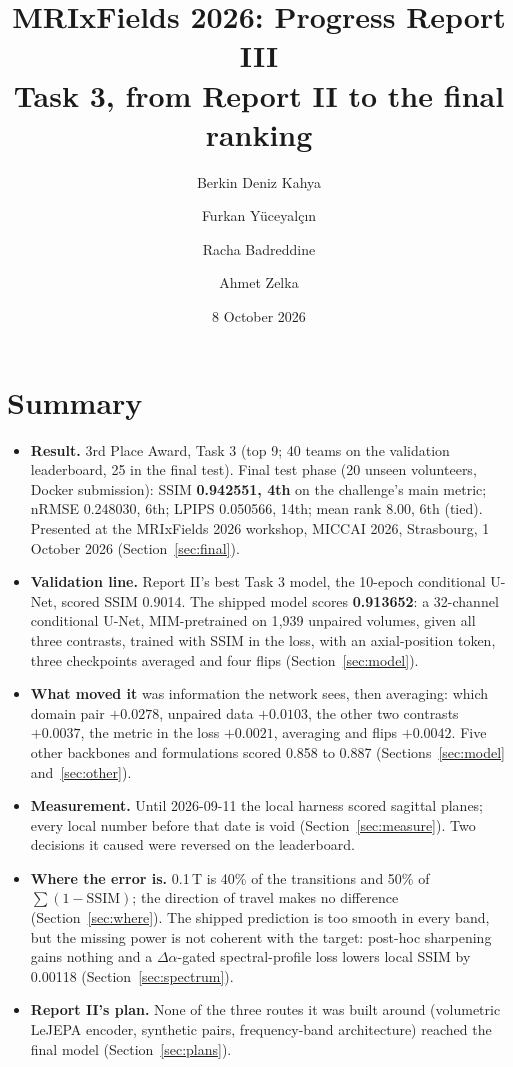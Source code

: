 \documentclass[10pt,a4paper]{article}
\title{\bfseries MRIxFields 2026: Progress Report III\\[0.3em]
\large Task 3, from Report II to the final ranking}
\author{Berkin Deniz Kahya \and Furkan Y\"uceyal\c{c}\i n \and Racha Badreddine \and Ahmet Zelka}
\date{8 October 2026}
\newcommand{\da}{\Delta\alpha}
\begin{document}
\sloppy
\maketitle

\section{Summary}\label{sec:summary}

\begin{itemize}
  \item \textbf{Result.} 3rd Place Award, Task 3 (top 9; 40 teams on the validation leaderboard, 25 in the final test). Final test phase (20 unseen
        volunteers, Docker submission): SSIM \textbf{0.942551, 4th} on the challenge's main
        metric; nRMSE 0.248030, 6th; LPIPS 0.050566, 14th; mean rank 8.00, 6th (tied). Presented
        at the MRIxFields 2026 workshop, MICCAI 2026, Strasbourg, 1 October 2026
        (Section~\ref{sec:final}).
  \item \textbf{Validation line.} Report II's best Task 3 model, the 10-epoch conditional U-Net,
        scored SSIM 0.9014. The shipped model scores \textbf{0.913652}: a 32-channel conditional
        U-Net, MIM-pretrained on 1{,}939 unpaired volumes, given all three contrasts, trained with
        SSIM in the loss, with an axial-position token, three checkpoints averaged and four flips
        (Section~\ref{sec:model}).
  \item \textbf{What moved it} was information the network sees, then averaging: which domain pair
        $+0.0278$, unpaired data $+0.0103$, the other two contrasts $+0.0037$, the metric in the
        loss $+0.0021$, averaging and flips $+0.0042$. Five other backbones and formulations
        scored 0.858 to 0.887 (Sections~\ref{sec:model} and~\ref{sec:other}).
  \item \textbf{Measurement.} Until 2026-09-11 the local harness scored sagittal planes; every
        local number before that date is void (Section~\ref{sec:measure}). Two decisions it
        caused were reversed on the leaderboard.
  \item \textbf{Where the error is.} 0.1\,T is 40\% of the transitions and 50\% of
        $\sum(1-\mathrm{SSIM})$; the direction of travel makes no difference
        (Section~\ref{sec:where}). The shipped prediction is too smooth in every band, but the
        missing power is not coherent with the target: post-hoc sharpening gains nothing and a
        $\da$-gated spectral-profile loss lowers local SSIM by 0.00118
        (Section~\ref{sec:spectrum}).
  \item \textbf{Report II's plan.} None of the three routes it was built around (volumetric
        LeJEPA encoder, synthetic pairs, frequency-band architecture) reached the final model
        (Section~\ref{sec:plans}).
\end{itemize}
\end{document}
